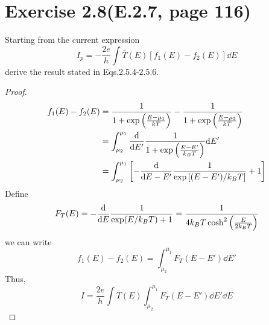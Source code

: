 \documentclass[11pt,a4paper]{article}
\theoremstyle{plain}
\theoremstyle{definition}
\theoremstyle{remark}
\begin{document}
\section*{Exercise 2.8(E.2.7, page 116)}
Starting from the current expression
\begin{equation*}
    I_p = -\frac{2e}{h} \int \overline{T}(E) \left[ f_1(E) - f_2(E) \right] \dd E
\end{equation*}
derive the result stated in Eqs.2.5.4-2.5.6.
\begin{proof}
    \begin{equation*}
        \begin{aligned}
            f_1(E) - f_2(E) &= \frac{1}{1+\exp\left(\frac{E-\mu_1}{kT}\right)} - \frac{1}{1+\exp\left(\frac{E-\mu_2}{kT}\right)} \\
            & = \int^{\mu_1}_{\mu_2} \dv{}{E'} \frac{1}{1+\exp\left(\frac{E-E'}{k_B T}\right)} \dd E' \\
            & = \int^{\mu_1}_{\mu_2} \left[ -\dv{}{E-E'}\frac{1}{\exp \left[ (E-E')/k_B T \right]} + 1 \right] \\
        \end{aligned}
    \end{equation*}
    Define
    \begin{equation*}
        F_T(E) = -\dv{}{E} \frac{1}{\exp(E/k_B T) + 1} = \frac{1}{4 k_B T \cosh^2\left(\frac{E}{2 k_B T}\right)}
    \end{equation*}
    we can write
    \begin{equation*}
        f_1(E) - f_2(E) = \int^{\mu_1}_{\mu_2} F_T(E - E') \dd E'
    \end{equation*}
    Thus,
    \begin{equation*}
        I = \frac{2e}{h} \int \overline{T}(E) \int^{\mu_1}_{\mu_2} F_T(E - E') \dd E' \dd E
    \end{equation*}
\end{proof}
\end{document}
